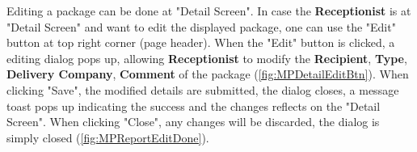 Editing a package can be done at "Detail Screen".
In case the \textbf{Receptionist} is at "Detail Screen" and want to edit the displayed package, one can use the "Edit" button at top right corner (page header). 
When the "Edit" button is clicked, a editing dialog pops up, allowing \textbf{Receptionist} to modify the \textbf{Recipient}, \textbf{Type}, \textbf{Delivery Company}, \textbf{Comment} of the package (\autoref{fig:MPDetailEditBtn}). 
When clicking "Save", the modified details are submitted, the dialog closes, a message toast pops up indicating the success and the changes reflects on the "Detail Screen". When clicking "Close", any changes will be discarded, the dialog is simply closed (\autoref{fig:MPReportEditDone}).

\begin{figure}[htb!]
	\centering
    \vspace{5pt}
    \hspace{5pt}

\end{figure}
